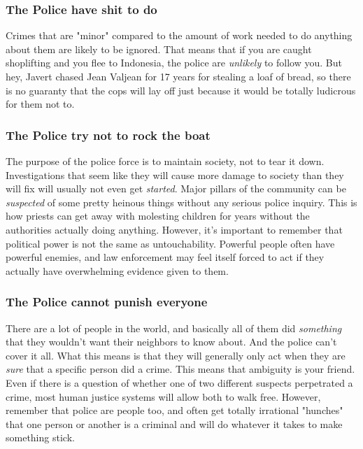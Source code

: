 \subsubsection{The Police have shit to do}
\hspace{\parindent} Crimes that are "minor" compared to the amount of work needed to do anything about them are likely to be ignored. That means that if you are caught shoplifting and you flee to Indonesia, the police are \textit{unlikely} to follow you. But hey, Javert chased Jean Valjean for 17 years for stealing a loaf of bread, so there is no guaranty that the cops will lay off just because it would be totally ludicrous for them not to.

\subsubsection{The Police try not to rock the boat}
\hspace{\parindent} The purpose of the police force is to maintain society, not to tear it down. Investigations that seem like they will cause more damage to society than they will fix will usually not even get \textit{started}. Major pillars of the community can be \textit{suspected} of some pretty heinous things without any serious police inquiry. This is how priests can get away with molesting children for years without the authorities actually doing anything. However, it's important to remember that political power is not the same as untouchability. Powerful people often have powerful enemies, and law enforcement may feel itself forced to act if they actually have overwhelming evidence given to them. 

\subsubsection{The Police cannot punish everyone}
\hspace{\parindent} There are a lot of people in the world, and basically all of them did \textit{something} that they wouldn't want their neighbors to know about. And the police can't cover it all. What this means is that they will generally only act when they are \textit{sure} that a specific person did a crime. This means that ambiguity is your friend. Even if there is a question of whether one of two different suspects perpetrated a crime, most human justice systems will allow both to walk free. However, remember that police are people too, and often get totally irrational "hunches" that one person or another is a criminal and will do whatever it takes to make something stick.

